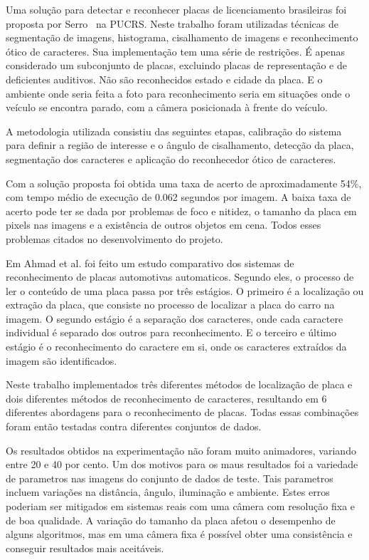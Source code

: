 
Uma solução para detectar e reconhecer placas de licenciamento brasileiras foi
proposta por Serro~\cite{serro2012deteccao} na PUCRS. Neste trabalho foram utilizadas
técnicas de segmentação de imagens, histograma, cisalhamento de imagens e reconhecimento
ótico de caracteres. Sua implementação tem uma série de restrições. É apenas considerado
um subconjunto de placas, excluindo placas de representação e de
deficientes auditivos. Não são reconhecidos estado e cidade da placa. E o
ambiente onde seria feita a foto para reconhecimento seria em situações onde o
veículo se encontra parado, com a câmera posicionada à frente do veículo.

A metodologia utilizada consistiu das seguintes etapas, calibração do sistema
para definir a região de interesse e o ângulo de cisalhamento, detecção da
placa, segmentação dos caracteres e aplicação do reconhecedor ótico de
caracteres.

Com a solução proposta foi obtida uma taxa de acerto de aproximadamente 54\%,
com tempo médio de execução de 0.062 segundos por imagem. A baixa taxa de acerto
pode ter se dada por problemas de foco e nitidez, o tamanho da placa em pixels
nas imagens e a existência de outros objetos em cena. Todos esses problemas
citados no desenvolvimento do projeto.

Em Ahmad et al.\cite{ahmad2015automatic} foi feito um estudo comparativo dos sistemas de
reconhecimento de placas automotivas automaticos. Segundo eles, o processo de
ler o conteúdo de uma placa passa por três estágios. O primeiro é a localização
ou extração da placa, que consiste no processo de localizar a placa do carro na
imagem. O segundo estágio é a separação dos caracteres, onde cada caractere
individual é separado dos outros para reconhecimento. E o terceiro e último
estágio é o reconhecimento do caractere em si, onde os caracteres extraídos da
imagem são identificados.

Neste trabalho implementados três diferentes métodos de localização de placa e dois
diferentes métodos de reconhecimento de caracteres, resultando em 6 diferentes
abordagens para o reconhecimento de placas. Todas essas combinações foram então
testadas contra diferentes conjuntos de dados.

Os resultados obtidos na experimentação não foram muito animadores, variando
entre 20 e 40 por cento. Um dos motivos para os maus resultados foi a variedade
de parametros nas imagens do conjunto de dados de teste. Tais parametros incluem
variações na distância, ângulo, iluminação e ambiente. Estes erros poderiam ser mitigados 
em sistemas reais com uma câmera com resolução fixa e de boa qualidade. A variação do
tamanho da placa afetou o desempenho de alguns algoritmos, mas em uma câmera
fixa é possível obter uma consistência e conseguir resultados mais aceitáveis.

